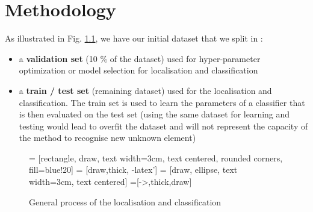 \chapter{Methodology} \label{sec:methodology}

As illustrated in Fig. \ref{fig:tikz_methodology}, we have our initial dataset that we split in :
\begin{itemize}
    \item a \textbf{validation set} (10 \% of the dataset) used for hyper-parameter optimization or model selection for localisation and classification
    \item a \textbf{train / test set} (remaining dataset) used for the localisation and classification. The train set is used to learn the parameters of a classifier that is then evaluated on the test set (using the same dataset for learning and testing would lead to overfit the dataset and will not represent the capacity of the method to recognise new unknown element)
\end{itemize}

\begin{figure}[h]
    \centering
     = [rectangle, draw, text width=3cm, text centered, rounded corners,  fill=blue!20]
     = [draw,thick, -latex']
     = [draw, ellipse, text width=3cm, text centered]
    =[->,thick,draw]
    \caption{General process of the localisation and classification}
    \label{fig:tikz_methodology}
\end{figure}

